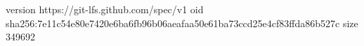 version https://git-lfs.github.com/spec/v1
oid sha256:7e11c54e80e7420e6ba6fb96b06aeafaa50e61ba73ccd25e4cf83ffda86b527c
size 349692
